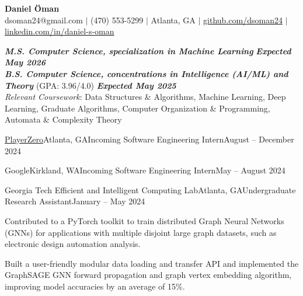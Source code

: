 \documentclass{article}
\begin{document}
\thispagestyle{empty}

\begin{center}
    \textbf{\LARGE Daniel Öman} \\
    dsoman24@gmail.com $|$ (470) 553-5299 $|$ Atlanta, GA $|$ \href{https://github.com/dsoman24}{github.com/dsoman24} $|$ \href{https://www.linkedin.com/in/daniel-s-oman/}{linkedin.com/in/daniel-s-oman}
\end{center}

\begin{flushleft}


{
    \textbf{\textit{M.S. Computer Science, specialization in Machine Learning}} \hfill \textit{\textbf{Expected May 2026}} \\
    \textbf{\textit{B.S. Computer Science, concentrations in Intelligence (AI/ML) and Theory}} (GPA: 3.96/4.0) \hfill \textit{\textbf{Expected May 2025}} \\
    \textit{Relevant Coursework}: Data Structures \& Algorithms, Machine Learning, Deep Learning, Graduate Algorithms, Computer Organization \& Programming, Automata \& Complexity Theory
}


    \begin{experiencenolist}{\href{https://www.playerzero.ai/}{PlayerZero}}{Atlanta, GA}{Incoming Software Engineering Intern}{August -- December 2024}
    \end{experiencenolist}

    \begin{experiencenolist}{Google}{Kirkland, WA}{Incoming Software Engineering Intern}{May -- August 2024}
    \end{experiencenolist}

    \begin{experience}{Georgia Tech Efficient and Intelligent Computing Lab}{Atlanta, GA}{Undergraduate Research Assistant}{January -- May 2024}
        \item Contributed to a PyTorch toolkit to train distributed Graph Neural Networks (GNNs) for applications with multiple disjoint large graph datasets, such as electronic design automation analysis.
        \item Built a user-friendly modular data loading and transfer API and implemented the GraphSAGE GNN forward propagation and graph vertex embedding algorithm, improving model accuracies by an average of 15\%.
    \end{experience}


\end{flushleft}
\end{document}
